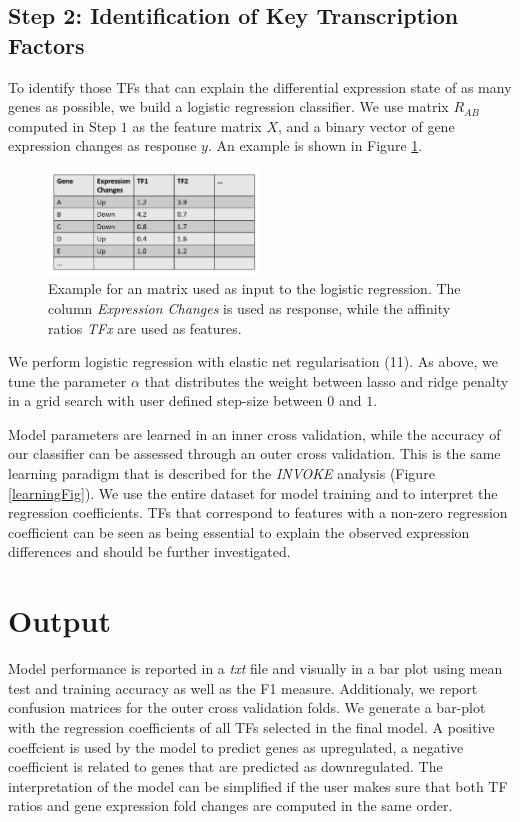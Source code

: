 \documentclass{article}
\begin{document}
\subsection*{Step 2: Identification of Key Transcription Factors}
To identify those TFs that can explain the differential expression state of as many genes as possible, we build a logistic regression classifier. 
We use matrix $R_{AB}$ computed in Step $1$ as the feature matrix $X$, and a binary vector of gene expression changes as response $y$. 
An example is shown in Figure \ref{Log-Reg-Example}.
\begin{figure}[h!]
\centering
\includegraphics[width=0.5\textwidth]{Example_Matrix.png}
\caption{Example for an matrix used as input to the logistic regression. The column \textit{Expression Changes} is used as response, while the affinity ratios \textit{TFx} are used as features.}
\label{Log-Reg-Example}
\end{figure}
We perform logistic regression with elastic net regularisation (11).
As above, we tune the parameter $\alpha$ that distributes the weight between lasso and ridge penalty in a grid search with user defined step-size between $0$ and $1$.

Model parameters are learned in an inner cross validation, while the accuracy of our classifier can be assessed through an outer cross validation. This is the
same learning paradigm that is described for the \textit{INVOKE} analysis (Figure \ref{learningFig}). We use the entire dataset for model training and to interpret the regression coefficients.
TFs that correspond to features with a non-zero regression coefficient can be seen as being essential to explain the observed expression differences and should be further investigated.

\section*{Output}
Model performance is reported in a \textit{txt} file and visually in a bar plot using mean test and training accuracy as well as the F1 measure. 
Additionaly, we report confusion matrices for the outer cross validation folds.
We generate a bar-plot with the regression coefficients of all TFs selected in the final model.
A positive coeffcient is used by the model to predict genes as upregulated, a negative coefficient is related to genes that are predicted as downregulated. The interpretation
of the model can be simplified if the user makes sure that both TF ratios and gene expression fold changes are computed in the same order. 
\newpage


\end{document}
